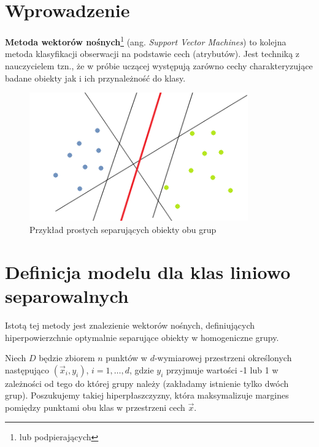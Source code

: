 \documentclass[
]{book}
\theoremstyle{plain}
\theoremstyle{definition}
\theoremstyle{definition}
\theoremstyle{definition}
\theoremstyle{definition}
\theoremstyle{remark}
\begin{document}
\hypertarget{wprowadzenie}{%
\section{Wprowadzenie}\label{wprowadzenie}}

\textbf{Metoda wektorów nośnych}\footnote{lub podpierających} (ang. \emph{Support Vector Machines}) to kolejna metoda klasyfikacji obserwacji na podstawie cech (atrybutów). Jest techniką z nauczycielem tzn., że w próbie uczącej występują zarówno cechy charakteryzujące badane obiekty jak i ich przynależność do klasy.

\begin{figure}

{\centering \includegraphics[width=3.71in]{images/SVM_Example_of_Hyperplanes} 

}

\caption{Przykład prostych separujących obiekty obu grup}\label{fig:svm1}
\end{figure}

\hypertarget{definicja-modelu-dla-klas-liniowo-separowalnych}{%
\section{Definicja modelu dla klas liniowo separowalnych}\label{definicja-modelu-dla-klas-liniowo-separowalnych}}

Istotą tej metody jest znalezienie wektorów nośnych, definiujących hiperpowierzchnie optymalnie separujące obiekty w homogeniczne grupy.

Niech \(D\) będzie zbiorem \(n\) punktów w \(d\)-wymiarowej przestrzeni określonych następująco \((\vec{x}_i, y_i)\), \(i=1,\ldots, d\), gdzie \(y_i\) przyjmuje wartości -1 lub 1 w zależności od tego do której grupy należy (zakładamy istnienie tylko dwóch grup). Poszukujemy takiej hiperpłaszczyzny, która maksymalizuje margines pomiędzy punktami obu klas w przestrzeni cech \(\vec{x}\).
\end{document}
